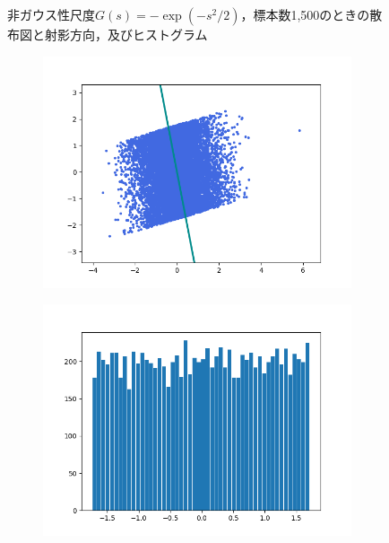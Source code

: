 \documentclass[class=jsarticle, crop=false, dvipdfmx, fleqn]{standalone}
\begin{document}
\begin{figure}
\begin{minipage}{0.45\linewidth}
\begin{figure}[H]
            \label{fig:exp_n1500_hist}
        \end{figure}
    \end{minipage}
    \caption{非ガウス性尺度\(G(s) = -\exp(-s^2/2)\)，標本数1,500のときの散布図と射影方向，及びヒストグラム}
    \label{fig:exp_n1500}
\end{figure}

\begin{figure}
	\centering
    \begin{minipage}{0.45\linewidth}
        \begin{figure}[H]
        	   \centering
            \includegraphics[clip, width=\linewidth]{../figures/assignment2_result_exp_n10000_scatter.png}
            \label{fig:exp_n10000_scatter}
        \end{figure}
    \end{minipage}
    \begin{minipage}{0.45\linewidth}
        \begin{figure}[H]
            \centering
            \includegraphics[clip, width=\linewidth]{../figures/assignment2_result_exp_n10000_hist.png}

\end{figure}
\end{minipage}
\end{figure}
\end{document}
